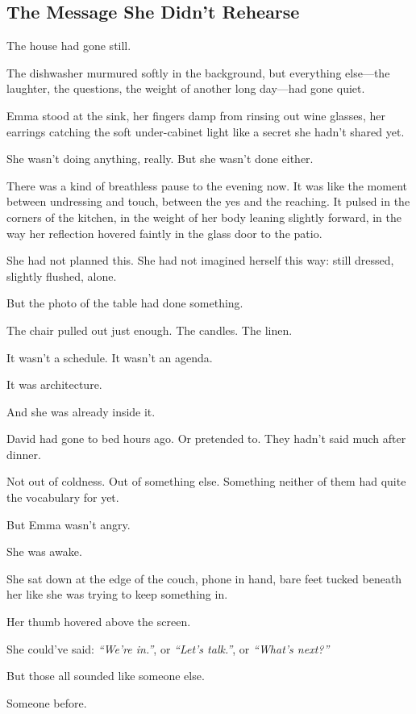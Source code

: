 
\subsection{The Message She Didn’t Rehearse}

The house had gone still.

The dishwasher murmured softly in the background, but everything else—the laughter, the questions, 
the weight of another long day—had gone quiet.

Emma stood at the sink, her fingers damp from rinsing out wine glasses, her earrings catching the 
soft under-cabinet light like a secret she hadn’t shared yet.

She wasn’t doing anything, really.
But she wasn’t done either.

There was a kind of breathless pause to the evening now. It was like the moment between undressing and 
touch, between the yes and the reaching. It pulsed in the corners of the kitchen, in the weight of her 
body leaning slightly forward, in the way her reflection hovered faintly in the glass door to the patio.

She had not planned this.
She had not imagined herself this way: still dressed, slightly flushed, alone.

But the photo of the table had done something.

The chair pulled out just enough. The candles. The linen.

It wasn’t a schedule. It wasn’t an agenda.

It was architecture.

And she was already inside it.

David had gone to bed hours ago.
Or pretended to.
They hadn’t said much after dinner.

Not out of coldness.
Out of something else.
Something neither of them had quite the vocabulary for yet.

But Emma wasn’t angry.

She was awake.

She sat down at the edge of the couch, phone in hand, bare feet tucked beneath her like she 
was trying to keep something in.

Her thumb hovered above the screen.

She could’ve said:
\textit{``We’re in.''}, or
\textit{``Let’s talk.''}, or
\textit{``What’s next?''}

But those all sounded like someone else.

Someone before.

